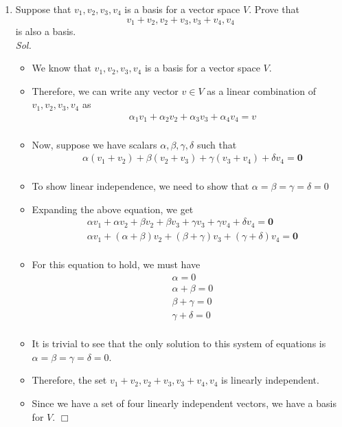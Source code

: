 \documentclass[11pt]{article}
\begin{document}
\begin{enumerate}
\begin{itemize}
  \end{itemize}
	
  \clearpage
	\item Suppose that $v_1,v_2,v_3,v_4$ is a basis for a vector space $V$. Prove that
	\begin{equation*}
		v_1 + v_2, v_2 + v_3, v_3 + v_4, v_4
	\end{equation*}
	is also a basis.
  \\
  \textit{ Sol. }
  \begin{itemize}
    \item[] We know that $v_1,v_2,v_3,v_4$ is a basis for a vector space $V$. 
    \item[] Therefore, we can write any vector $v \in V$ as a linear 
      combination of $v_1,v_2,v_3,v_4$ as \begin{align*}
        & \alpha_1 v_1 + \alpha_2 v_2 + \alpha_3 v_3 + \alpha_4 v_4 = v \\
      \end{align*}
     \item[] Now, suppose we have scalars $\alpha, \beta, \gamma, \delta$ 
      such that \begin{align*}
      & \alpha(v_1 + v_2) + \beta(v_2 + v_3) + \gamma(v_3 + v_4) + \delta v_4 = \mathbf{0} \\
      \end{align*}
    \item[] To show linear independence, we need to show that $\alpha = \beta
      = \gamma = \delta = 0$
    \item[] Expanding the above equation, we get \begin{align*}
        & \alpha v_1 + \alpha v_2 + \beta v_2 + \beta v_3 + \gamma v_3 + \gamma v_4 + \delta v_4 = \mathbf{0} \\
      & \alpha v_1 + (\alpha + \beta) v_2 + (\beta + \gamma) v_3 + (\gamma + \delta) v_4 = \mathbf{0} \\
      \end{align*}
    \item[] For this equation to hold, we must have \begin{align*}
      & \alpha = 0 \\
      & \alpha + \beta = 0 \\
      & \beta + \gamma = 0 \\
      & \gamma + \delta = 0 \\
      \end{align*}
    \item[] It is trivial to see that the only solution to this system of equations is $\alpha = \beta = \gamma = \delta = 0$. 
    \item[] Therefore, the set $v_1 + v_2, v_2 + v_3, v_3 + v_4, v_4$ is linearly independent. 
    \item[] Since we have a set of four linearly independent vectors, we have a basis for $V$. $\Box$
    

\end{itemize}
\end{enumerate}
\end{document}
